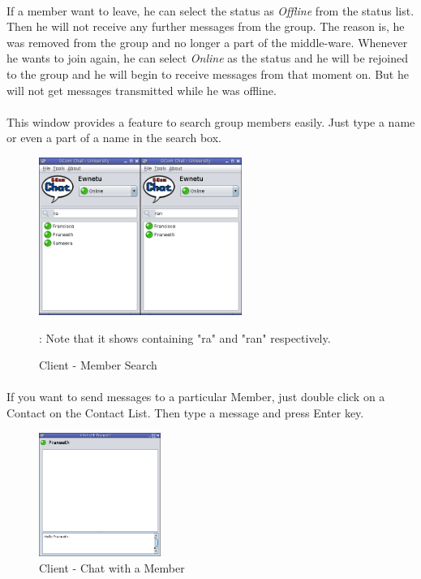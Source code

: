 \documentclass[a4paper,english,twoside]{article}
\begin{document}
\paragraph{}
If a member want to leave, he can select the status as \textit{Offline} from the status list. Then he will not receive any further messages from the group. The reason is, he was removed from the group and no longer a part of the middle-ware. Whenever he wants to join again, he can select \textit{Online} as the status and he will be rejoined to the group and he will begin to receive messages from that moment on. But he will not get messages transmitted while he was offline.

\paragraph{}
This window provides a feature to search group members easily. Just type a name or even a part of a name in the search box.

\begin{figure}[h]
\begin{center}
\includegraphics[width=250px]{Client-Search.png}
\caption{Client - Member Search}
\figurename{: Note that it shows containing "ra" and "ran" respectively.}
\end{center}
\end{figure}
\paragraph{}
If you want to send messages to a particular Member, just double click on a Contact on the Contact List. Then type a message and press Enter key.

\begin{figure}[h]
\begin{center}
\includegraphics[width=150px]{Client-Chat-1.png}
\caption{Client - Chat with a Member}
\end{center}
\end{figure}
\end{document}
